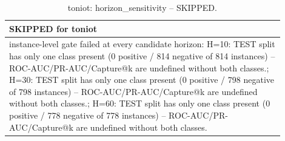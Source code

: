 \begin{table}[t]
\centering
\caption{toniot: horizon_sensitivity -- SKIPPED.}
\label{tab:toniot_horizon_sensitivity}
\begin{tabular}{p{0.9\linewidth}}
\toprule
\textbf{SKIPPED for toniot} \\
\midrule
instance-level gate failed at every candidate horizon: H=10: TEST split has only one class present (0 positive / 814 negative of 814 instances) -- ROC-AUC/PR-AUC/Capture@k are undefined without both classes.; H=30: TEST split has only one class present (0 positive / 798 negative of 798 instances) -- ROC-AUC/PR-AUC/Capture@k are undefined without both classes.; H=60: TEST split has only one class present (0 positive / 778 negative of 778 instances) -- ROC-AUC/PR-AUC/Capture@k are undefined without both classes. \\
\bottomrule
\end{tabular}
\end{table}
